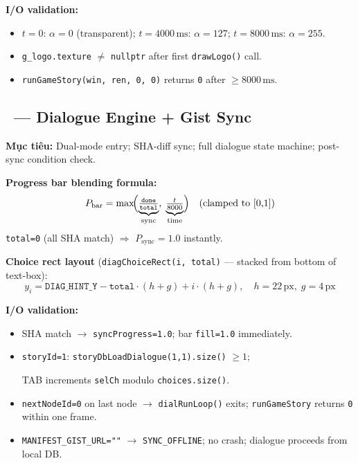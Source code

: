 \documentclass[12pt,a4paper]{article}
\begin{document}
\noindent\textbf{I/O validation:}
\begin{itemize}[nosep]
  \item $t=0$: $\alpha=0$ (transparent); $t=4000\,\text{ms}$: $\alpha=127$;
$t=8000\,\text{ms}$: $\alpha=255$.
  \item \texttt{g\_logo.texture} $\neq$ \texttt{nullptr} after first \texttt{drawLogo()} call.
  \item \texttt{runGameStory(win, ren, 0, 0)} returns \texttt{0} after $\geq8000\,\text{ms}$.

\end{itemize}

\subsection{\Vtwo\ --- Dialogue Engine + Gist Sync}

\textbf{Mục tiêu:} Dual-mode entry; SHA-diff sync; full dialogue state machine;
post-sync condition check.

\noindent\textbf{Progress bar blending formula:}
\[
  P_{\text{bar}} = \max\!\Bigl(\underbrace{\tfrac{\texttt{done}}{\texttt{total}}}_{\text{sync}},\;
                               \underbrace{\tfrac{t}{8000}}_{\text{time}}\Bigr)
  \quad \text{(clamped to [0,1])}
\]
\texttt{total=0} (all SHA match) $\Rightarrow$ $P_\text{sync}=1.0$ instantly.

\noindent\textbf{Choice rect layout}
(\texttt{diagChoiceRect(i, total)} — stacked from bottom of text-box):
\[
  y_i = \texttt{DIAG\_HINT\_Y} - \texttt{total}\cdot(h+g) + i\cdot(h+g),
  \quad h=22\,\text{px},\;
  g=4\,\text{px}
\]

\noindent\textbf{I/O validation:}
\begin{itemize}[nosep]
  \item SHA match $\rightarrow$ \texttt{syncProgress=1.0}; bar \texttt{fill=1.0} immediately.
  \item \texttt{storyId=1}: \texttt{storyDbLoadDialogue(1,1).size()} $\geq 1$;

  TAB increments \texttt{selCh} modulo \texttt{choices.size()}.
  \item \texttt{nextNodeId=0} on last node $\rightarrow$ \texttt{dialRunLoop()} exits;
        \texttt{runGameStory} returns \texttt{0} within one frame.

  \item \foreignlanguage{english}{\texttt{MANIFEST\_GIST\_URL=""}} $\rightarrow$ \texttt{SYNC\_OFFLINE}; no crash;
        dialogue proceeds from local DB.

\end{itemize}
\end{document}
